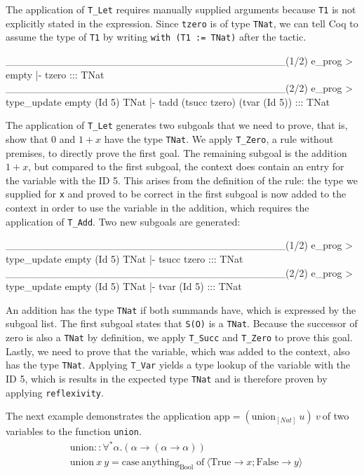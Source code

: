 \documentclass[paper = a4, fleqn, abstract=on, twoside]{scrreprt}
\newcommand{\coqinline}[1]{\texttt{#1}}
\begin{document}
The application of \coqinline{T_Let} requires manually supplied arguments because \coqinline{T1} is not explicitly stated in the expression. Since \coqinline{tzero} is of type \coqinline{TNat}, we can tell Coq to assume the type of \coqinline{T1} by writing \coqinline{with (T1 := TNat)} after the tactic.
\par
\begin{coqcode}
______________________________________(1/2)
e_prog > empty |- tzero ::: TNat
______________________________________(2/2)
e_prog > type_update empty (Id 5) TNat |- tadd (tsucc tzero) 
                                               (tvar (Id 5)) ::: TNat
\end{coqcode}
The application of \texttt{T\_Let} generates two subgoals that we need to prove, that is, show that 0 and $1 + x$ have the type \coqinline{TNat}. We apply \texttt{T\_Zero}, a rule without premises, to directly prove the first goal. The remaining subgoal is the addition $1 + x$, but compared to the first subgoal, the context does contain an entry for the variable with the ID 5. This arises from the definition of the rule: the type we supplied for \texttt{x} and proved to be correct in the first subgoal is now added to the context in order to use the variable in the addition, which requires the application of \texttt{T\_Add}. Two new subgoals are generated:
\begin{coqcode}
______________________________________(1/2)
e_prog > type_update empty (Id 5) TNat |- tsucc tzero ::: TNat
______________________________________(2/2)
e_prog > type_update empty (Id 5) TNat |- tvar (Id 5) ::: TNat
\end{coqcode}
An addition has the type \texttt{TNat} if both summands have, which is expressed by the subgoal list. The first subgoal states that \texttt{S(O)} is a \texttt{TNat}. Because the successor of zero is also a \texttt{TNat} by definition, we apply \texttt{T\_Succ} and \texttt{T\_Zero} to prove this goal. Lastly, we need to prove that the variable, which was added to the context, also has the type \texttt{TNat}. Applying \texttt{T\_Var} yields a type lookup of the variable with the ID 5, which is results in the expected type \texttt{TNat} and is therefore proven by applying \texttt{reflexivity}.\\
\par \noindent
The next example demonstrates the application $\text{app} = (\text{union}_{[Nat]} \: u) \: v \:$of two variables to the function \texttt{union}.
\begin{align*}
&\text{union}::\forall^{*}\alpha.(\alpha \rightarrow (\alpha \rightarrow \alpha))\\
&\text{union}\: x \: y = \text{case}\: \text{anything}_{\text{Bool}} \; \text{of}\: \langle \text{True} \rightarrow x; \text{False} \rightarrow y\rangle
\end{align*}
\end{document}
